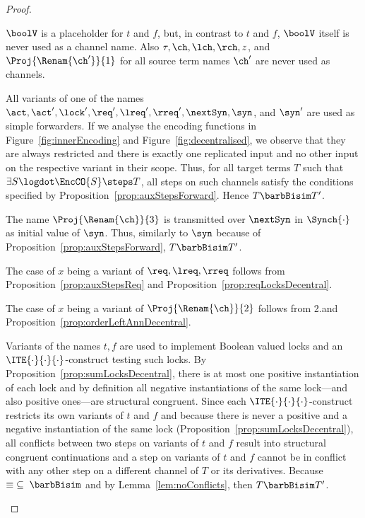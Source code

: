 \documentclass[]{eptcs}
\begin{document}
\begin{proof}
\begin{compactenum}
		\item $ \boolV $ is a placeholder for $ t $ and $ f $, but, in contrast to $ t $ and $ f $, $ \boolV $ itself is never used as a channel name. Also $ \tau, \ch, \lch, \rch, z $, and $ \Proj{\Renam{\ch'}}{1} $ for all source term names $ \ch' $ are never used as channels.
		\item All variants of one of the names $ \act, \act', \lock', \req', \lreq', \rreq', \nextSyn, \syn $, and $ \syn' $ are used as simple forwarders. If we analyse the encoding functions in Figure~\ref{fig:innerEncoding} and Figure~\ref{fig:decentralised}, we observe that they are always restricted and there is exactly one replicated input and no other input on the respective variant in their scope. Thus, for all target terms $ T $ such that $ \exists S\logdot \EncCO{S} \steps T $, all steps on such channels satisfy the conditions specified by Proposition~\ref{prop:auxStepsForward}. Hence $ T \barbBisim T' $.
		\item The name $ \Proj{\Renam{\ch}}{3} $ is transmitted over $ \nextSyn $ in $ \Synch{\cdot} $ as initial value of $ \syn $. Thus, similarly to $ \syn $ because of Proposition~\ref{prop:auxStepsForward}, $ T \barbBisim T' $.
		\item The case of $ x $ being a variant of $ \req, \lreq, \rreq $ follows from Proposition~\ref{prop:auxStepsReq} and Proposition~\ref{prop:reqLocksDecentral}.
		\item The case of $ x $ being a variant of $ \Proj{\Renam{\ch}}{2} $ follows from 2.\@ and Proposition~\ref{prop:orderLeftAnnDecentral}.
		\item Variants of the names $ t, f $ are used to implement Boolean valued locks and an $ \ITE{\cdot}{\cdot}{\cdot} $-construct testing such locks. By Proposition~\ref{prop:sumLocksDecentral}, there is at most one positive instantiation of each lock and by definition all negative instantiations of the same lock---and also positive ones---are structural congruent. Since each $ \ITE{\cdot}{\cdot}{\cdot} $-construct restricts its own variants of $ t $ and $ f $ and because there is never a positive and a negative instantiation of the same lock (Proposition~\ref{prop:sumLocksDecentral}), all conflicts between two steps on variants of $ t $ and $ f $ result into structural congruent continuations and a step on variants of $ t $ and $ f $ cannot be in conflict with any other step on a different channel of $ T $ or its derivatives. Because $ \equiv \; \subseteq \; \barbBisim $ and by Lemma~\ref{lem:noConflicts}, then $ T \barbBisim T' $.

\end{compactenum}
\end{proof}
\end{document}

